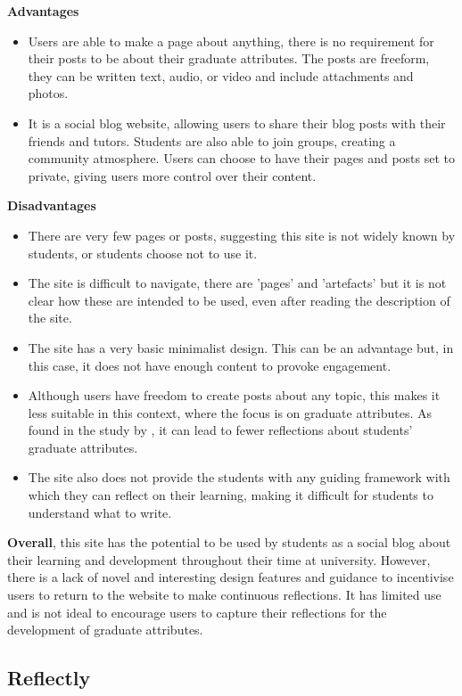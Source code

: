 \documentclass{l4proj}
\begin{document}
\textbf{Advantages}
\begin{itemize}
    \item Users are able to make a page about anything, there is no requirement for their posts to be about their graduate attributes. The posts are freeform, they can be written text, audio, or video and include attachments and photos.
    \item It is a social blog website, allowing users to share their blog posts with their friends and tutors. Students are also able to join groups, creating 
    a community atmosphere. Users can choose to have their pages and posts set to private, giving users more control over their content.
\end{itemize}

\textbf{Disadvantages}
\begin{itemize}
    \item There are very few pages or posts, suggesting this site is not widely known by students, or students choose not to use it.
    \item The site is difficult to navigate, there are 'pages' and 'artefacts' but it is not clear how these are intended to be used, even after reading the description of the site. 
    \item The site has a very basic minimalist design. This can be an advantage but, in this case, it does not have enough content to provoke engagement.
    \item Although users have freedom to create posts about any topic, this makes it less suitable in this context, where the focus is on graduate attributes. As found in the study by \citet{mcdermott_developing_nodate}, it can lead to fewer reflections about students' graduate attributes.
    \item The site also does not provide the students with any guiding framework with which they can reflect on their learning, making it difficult for students to understand what to write.
\end{itemize}

\textbf{Overall}, this site has the potential to be used by students as a social blog about their learning and development throughout their time at university. However, there is a lack of novel and interesting design features and guidance to incentivise users to return to the website to make continuous reflections. It has limited use and is not ideal to encourage users to capture their reflections for the development of graduate attributes.

\subsection{Reflectly}
\end{document}
